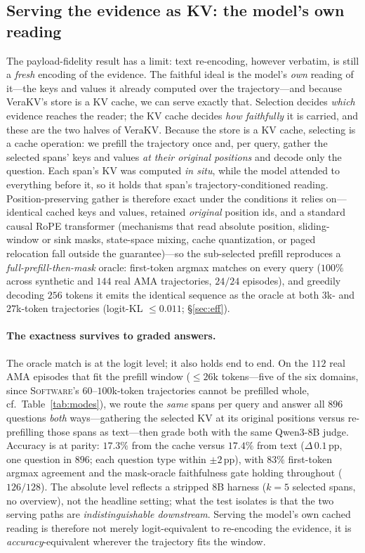 \documentclass{article} %
\newcommand{\pp}{\,\mathrm{pp}}
\newcommand{\kvm}{VeraKV}
\begin{document}
\subsection{Serving the evidence as KV: the model's own reading}
\label{sec:kvserve}
The payload-fidelity result has a limit: text re-encoding, however verbatim, is
still a \emph{fresh} encoding of the evidence. The faithful ideal is the model's
\emph{own} reading of it---the keys and values it already computed over the
trajectory---and because \kvm{}'s store is a KV cache, we can serve exactly that.
Selection decides \emph{which} evidence reaches the reader; the KV cache decides
\emph{how faithfully} it is carried, and these are the two halves of \kvm{}.
Because the store is a KV cache, selecting is a cache operation: we prefill the
trajectory once and, per query, gather the selected spans' keys and values
\emph{at their original positions} and decode only the question. Each span's KV
was computed \emph{in situ}, while the model attended to everything before it, so
it holds that span's trajectory-conditioned reading. Position-preserving gather is
therefore exact under the conditions it relies on---identical cached keys and
values, retained \emph{original} position ids, and a standard causal RoPE
transformer (mechanisms that read absolute position, sliding-window or sink masks,
state-space mixing, cache quantization, or paged relocation fall outside the
guarantee)---so the sub-selected prefill reproduces a
\emph{full-prefill-then-mask} oracle: first-token argmax matches on every query
($100\%$ across synthetic and $144$ real AMA trajectories, $24/24$ episodes), and
greedily decoding $256$ tokens it emits the identical sequence as the oracle at
both $3$k- and $27$k-token trajectories (logit-KL $\le\!0.011$; \S\ref{sec:eff}).

\paragraph{The exactness survives to graded answers.} The oracle match is at the
logit level; it also holds end to end. On the $112$ real AMA episodes that fit the
prefill window ($\le\!26$k tokens---five of the six domains, since
\textsc{Software}'s $60$--$100$k-token trajectories cannot be prefilled whole,
cf.\ Table~\ref{tab:modes}), we route the \emph{same} spans per query and answer all
$896$ questions \emph{both} ways---gathering the selected KV at its original
positions versus re-prefilling those spans as text---then grade both with the same
Qwen3-8B judge. Accuracy is at parity: $17.3\%$ from the cache versus $17.4\%$ from
text ($\Delta\,0.1\pp$, one question in $896$; each question type within $\pm2\pp$),
with $83\%$ first-token argmax agreement and the mask-oracle faithfulness gate
holding throughout ($126/128$). The absolute level reflects a stripped
$8$B harness ($k{=}5$ selected spans, no overview), not the headline setting;
what the test isolates is that the two serving paths are \emph{indistinguishable
downstream}. Serving the model's own cached reading is therefore not merely
logit-equivalent to re-encoding the evidence, it is \emph{accuracy}-equivalent
wherever the trajectory fits the window.
\end{document}
